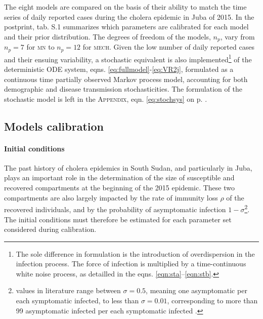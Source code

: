  The eight models are compared on the basis of their ability to match the time series of daily reported cases during the cholera epidemic in Juba of 2015. In the postprint, tab. S.1 summarizes which parameters are calibrated for each model and their prior distribution. The degrees of freedom of the models, $n_p$, vary from $n_p=7$ for \textsc{mn} to $n_p=12$ for \textsc{mech}. Given the low number of daily reported cases and their ensuing variability, a stochastic equivalent is also implemented\footnote[][-8\baselineskip]{The sole difference in formulation is the introduction of overdispersion in the infection process. The force of infection is multiplied by a time-continuous white noise process, as detailled in the eqns. \eqref{eqn:sta}--\eqref{eqn:stb}.} of the deterministic ODE system, eqns. \eqref{eq:fullmodel}-\eqref{eq:VR2j}, formulated as a continuous time partially observed Markov process model, accounting for both demographic and disease transmission stochasticities\cite{Breto:TimeSeriesAnalysis:2009}. The formulation of the stochastic model is left in the \textsc{Appendix}, eqn. \eqref{eq:stochsys} on p. \pageref{eq:stochsys}.

\subsection{Models calibration}
\paragraph{Initial conditions} The past history of cholera epidemics in South Sudan, and particularly in Juba, plays an important role in the determination of the size of susceptible and recovered compartments at the beginning of the 2015 epidemic. These two compartments are also largely impacted by the rate of immunity loss $\rho$ of the recovered individuals, and by the probability of asymptomatic infection $1-\sigma$\footnote[][2\baselineskip]{values in literature range between $\sigma=0.5$, meaning one asymptomatic per each symptomatic infected, to less than $\sigma=0.01$, corresponding to more than 99 asymptomatic infected per each symptomatic infected \parencite{Fung:CholeraTransmissionDynamic:2014}.}. The initial conditions must therefore be estimated for each parameter set considered during calibration.

